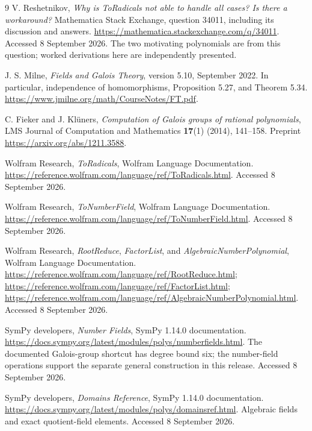 \documentclass[11pt,a4paper]{article}
\theoremstyle{definition}
\begin{document}
\begin{thebibliography}{9}
V. Reshetnikov, \emph{Why is ToRadicals not able to handle all cases? Is there a
workaround?} Mathematica Stack Exchange, question 34011, including its discussion
and answers. \url{https://mathematica.stackexchange.com/q/34011}.
Accessed 8 September 2026. The two motivating polynomials are from this question;
worked derivations here are independently presented.

J. S. Milne, \emph{Fields and Galois Theory}, version 5.10, September 2022.
In particular, independence of homomorphisms, Proposition 5.27, and Theorem 5.34.
\url{https://www.jmilne.org/math/CourseNotes/FT.pdf}.

C. Fieker and J. Kl\"uners, \emph{Computation of Galois groups of rational
polynomials}, LMS Journal of Computation and Mathematics \textbf{17}(1)
(2014), 141--158. Preprint \url{https://arxiv.org/abs/1211.3588}.

Wolfram Research, \emph{ToRadicals}, Wolfram Language Documentation.
\url{https://reference.wolfram.com/language/ref/ToRadicals.html}.
Accessed 8 September 2026.

Wolfram Research, \emph{ToNumberField}, Wolfram Language Documentation.
\url{https://reference.wolfram.com/language/ref/ToNumberField.html}.
Accessed 8 September 2026.

Wolfram Research, \emph{RootReduce}, \emph{FactorList}, and
\emph{AlgebraicNumberPolynomial}, Wolfram Language Documentation.
\url{https://reference.wolfram.com/language/ref/RootReduce.html};
\url{https://reference.wolfram.com/language/ref/FactorList.html};
\url{https://reference.wolfram.com/language/ref/AlgebraicNumberPolynomial.html}.
Accessed 8 September 2026.

SymPy developers, \emph{Number Fields}, SymPy 1.14.0 documentation.
\url{https://docs.sympy.org/latest/modules/polys/numberfields.html}.
The documented Galois-group shortcut has degree bound six; the number-field
operations support the separate general construction in this release.
Accessed 8 September 2026.

SymPy developers, \emph{Domains Reference}, SymPy 1.14.0 documentation.
\url{https://docs.sympy.org/latest/modules/polys/domainsref.html}.
Algebraic fields and exact quotient-field elements.
Accessed 8 September 2026.
\end{thebibliography}
\end{document}
